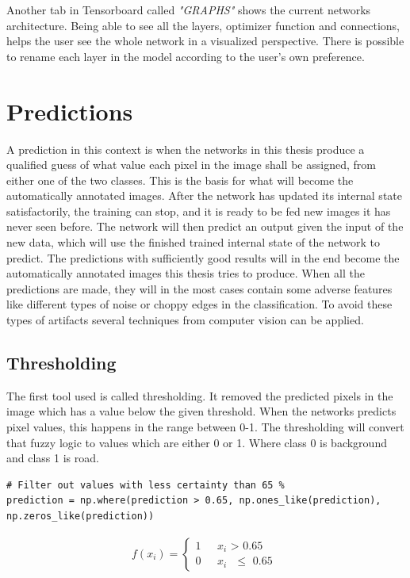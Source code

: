 \documentclass[USenglish]{ifimaster}  %
\begin{document}
Another tab in Tensorboard called \textit{"GRAPHS"} shows the current networks architecture. Being able to see all the layers, optimizer function and connections, helps the user see the whole network in a visualized perspective. There is possible to rename each layer in the model according to the user's own preference. 
\section{Predictions}
A prediction in this context is when the networks in this thesis produce a qualified guess of what value each pixel in the image shall be assigned, from either one of the two classes. This is the basis for what will become the automatically annotated images. After the network has updated its internal state satisfactorily, the training can stop, and it is ready to be fed new images it has never seen before. The network will then predict an output given the input of the new data, which will use the finished trained internal state of the network to predict. The predictions with sufficiently good results will in the end become the automatically annotated images this thesis tries to produce. When all the predictions are made, they will in the most cases contain some adverse features like different types of noise or choppy edges in the classification. To avoid these types of artifacts several techniques from computer vision can be applied.

\subsection{Thresholding}
The first tool used is called thresholding. It removed the predicted pixels in the image which has a value below the given threshold. When the networks predicts pixel values, this happens in the range between 0-1. The thresholding will convert that fuzzy logic to values which are either 0 or 1. Where class 0 is background and class 1 is road.
\begin{verbatim}
# Filter out values with less certainty than 65 %
prediction = np.where(prediction > 0.65, np.ones_like(prediction), 
np.zeros_like(prediction))
\end{verbatim}

\begin{equation}\label{eq:thresholding}
\begin{aligned}
{f(x_i)=
\begin{cases}
    1 & \text{ $x_i$ > 0.65 }  \\
    0 & \text{ $x_i$ $\leq$ 0.65 }
\end{cases}}
\end{aligned}
\end{equation}
\end{document}
